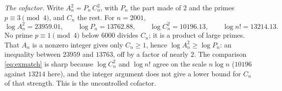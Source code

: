 \documentclass[11pt]{amsart}
\numberwithin{equation}{section}
\theoremstyle{definition}
\theoremstyle{remark}
\begin{document}
\emph{The cofactor.} Write $A_n^2=P_n\,C_n^2$, with $P_n$ the part made of $2$ and the primes $p\equiv3\pmod4$, and $C_n$ the rest. For $n=2001$,
\begin{equation}\label{eq:excof}
 \log A_n^2=23959.01,\qquad\log P_n=13762.88,\qquad\log C_n^2=10196.13,\qquad\log n!=13214.13 .
\end{equation}
No prime $p\equiv1\pmod4$ below $6000$ divides $C_n$; it is a product of large primes. That $A_n$ is a nonzero integer gives only $C_n\ge1$, hence $\log A_n^2\ge\log P_n$: an inequality between $23959$ and $13763$, off by a factor of nearly $2$. The comparison \eqref{eq:exmatch} is sharp because $\log C_n^2$ and $\log n!$ agree on the scale $n\log n$ ($10196$ against $13214$ here), and the integer argument does not give a lower bound for $C_n$ of that strength. This is the uncontrolled cofactor.
\end{document}
